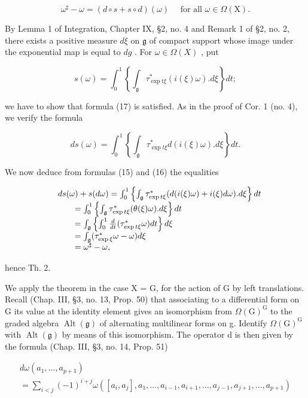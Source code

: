 \[
\omega^ {\sharp} - \omega = (d \circ s + s \circ d) (\omega) \quad \text { for   all } \omega \in \Omega (\mathrm{X}).\tag{17}
\]

By Lemma 1 of Integration, Chapter IX, §2, no. 4 and Remark 1 of §2, no. 2, there exists a positive measure \(d\xi\) on \(\mathfrak{g}\) of compact support whose image under the exponential map is equal to \(dg\) . For \(\omega \in \Omega(X)\) , put

\[
s (\omega) = \int_ {0} ^ {1} \left\{\int_ {\mathfrak {g}} \tau_ {\exp t \xi} ^ {*} (i (\xi) \omega). d \xi \right\} d t;
\]

we have to show that formula (17) is satisfied. As in the proof of Cor. 1 (no. 4), we verify the formula

\[
d s (\omega) = \int_ {0} ^ {1} \left\{\int_ {\mathfrak {g}} \tau_ {\exp t \xi} ^ {*} d (i (\xi) \omega). d \xi \right\} d t.
\]

We now deduce from formulas (15) and (16) the equalities

\[
\begin{array}{r l} & {d s (\omega) + s (d \omega) = \int_ {0} ^ {1} \left\{\int_ {\mathfrak {g}} \tau_ {\exp t \xi} ^ {*} (d (i (\xi) \omega) + i (\xi) d \omega). d \xi \right\} d t} \\ & {\qquad = \int_ {0} ^ {1} \left\{\int_ {\mathfrak {g}} \tau_ {\exp t \xi} ^ {*} (\theta (\xi) \omega). d \xi \right\} d t} \\ & {\qquad = \int_ {\mathfrak {g}} \left\{\int_ {0} ^ {1} \frac {d}{d t} (\tau_ {\exp t \xi} ^ {*} \omega) d t \right\} d \xi} \\ & {\qquad = \int_ {\mathfrak {g}} (\tau_ {\exp \xi} ^ {*} \omega - \omega) d \xi} \\ & {\qquad = \omega^ {\sharp} - \omega ,} \end{array}
\]

hence Th. 2.

We apply the theorem in the case X = G, for the action of G by left translations. Recall (Chap. III, §3, no. 13, Prop. 50) that associating to a differential form on G its value at the identity element gives an isomorphism from \(\Omega(\mathrm{G})^{\mathrm{G}}\) to the graded algebra \(\operatorname{Alt}(\mathfrak{g})\) of alternating multilinear forms on g. Identify \(\Omega(\mathrm{G})^{\mathrm{G}}\) with \(\operatorname{Alt}(\mathfrak{g})\) by means of this isomorphism. The operator d is then given by the formula (Chap. III, §3, no. 14, Prop. 51)

\[
\begin{array}{l} d \omega (a _ {1}, \ldots , a _ {p + 1}) \\ = \sum_ {i <   j} (- 1) ^ {i + j} \omega ([ a _ {i}, a _ {j} ], a _ {1}, \ldots , a _ {i - 1}, a _ {i + 1}, \ldots , a _ {j - 1}, a _ {j + 1}, \ldots , a _ {p + 1}) \end{array}
\]

